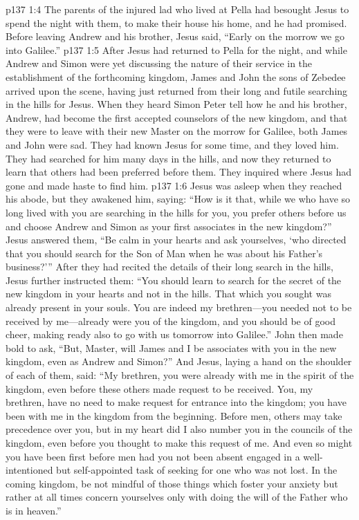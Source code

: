 \pc \vs p137 1:4 The parents of the injured lad who lived at Pella had besought Jesus to spend the night with them, to make their house his home, and he had promised. Before leaving Andrew and his brother, Jesus said, \textcolor{ubdarkred}{“Early on the morrow we go into Galilee.”}
\pc \vs p137 1:5 After Jesus had returned to Pella for the night, and while Andrew and Simon were yet discussing the nature of their service in the establishment of the forthcoming kingdom, James and John the sons of Zebedee arrived upon the scene, having just returned from their long and futile searching in the hills for Jesus. When they heard Simon Peter tell how he and his brother, Andrew, had become the first accepted counselors of the new kingdom, and that they were to leave with their new Master on the morrow for Galilee, both James and John were sad. They had known Jesus for some time, and they loved him. They had searched for him many days in the hills, and now they returned to learn that others had been preferred before them. They inquired where Jesus had gone and made haste to find him.
\vs p137 1:6 Jesus was asleep when they reached his abode, but they awakened him, saying: “How is it that, while we who have so long lived with you are searching in the hills for you, you prefer others before us and choose Andrew and Simon as your first associates in the new kingdom?” Jesus answered them, \textcolor{ubdarkred}{“Be calm in your hearts and ask yourselves, ‘who directed that you should search for the Son of Man when he was about his Father’s business?’”} After they had recited the details of their long search in the hills, Jesus further instructed them: \textcolor{ubdarkred}{“You should learn to search for the secret of the new kingdom in your hearts and not in the hills. That which you sought was already present in your souls. You are indeed my brethren---you needed not to be received by me---already were you of the kingdom, and you should be of good cheer, making ready also to go with us tomorrow into Galilee.”} John then made bold to ask, “But, Master, will James and I be associates with you in the new kingdom, even as Andrew and Simon?” And Jesus, laying a hand on the shoulder of each of them, said: \textcolor{ubdarkred}{“My brethren, you were already with me in the spirit of the kingdom, even before these others made request to be received. You, my brethren, have no need to make request for entrance into the kingdom; you have been with me in the kingdom from the beginning. Before men, others may take precedence over you, but in my heart did I also number you in the councils of the kingdom, even before you thought to make this request of me. And even so might you have been first before men had you not been absent engaged in a well\hyp{}intentioned but self\hyp{}appointed task of seeking for one who was not lost. In the coming kingdom, be not mindful of those things which foster your anxiety but rather at all times concern yourselves only with doing the will of the Father who is in heaven.”}
